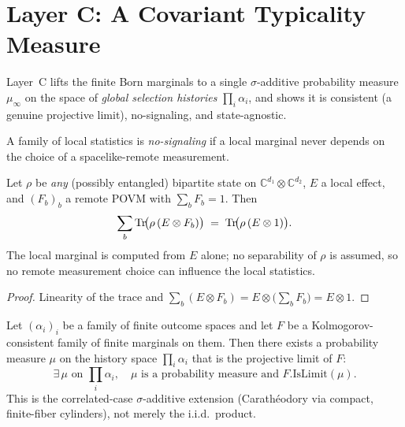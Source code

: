 \chapter{Layer C: A Covariant Typicality Measure}
\label{chap:layerC}

Layer~C lifts the finite Born marginals to a single $\sigma$-additive probability
measure $\mu_\infty$ on the space of \emph{global selection histories}
$\prod_i \alpha_i$, and shows it is consistent (a genuine projective limit),
no-signaling, and state-agnostic.

\begin{definition}
  \label{def:no-signaling}
  A family of local statistics is \emph{no-signaling} if a local marginal never
  depends on the choice of a spacelike-remote measurement.
\end{definition}

\begin{theorem}
  \label{thm:no-signaling}
  \leanok
  Let $\rho$ be \emph{any} (possibly entangled) bipartite state on
  $\mathbb{C}^{d_1}\otimes\mathbb{C}^{d_2}$, $E$ a local effect, and $(F_b)_b$ a
  remote POVM with $\sum_b F_b = 1$. Then
  \[
    \sum_b \operatorname{Tr}\!\bigl(\rho\,(E\otimes F_b)\bigr)
    \;=\; \operatorname{Tr}\!\bigl(\rho\,(E\otimes 1)\bigr) .
  \]
  The local marginal is computed from $E$ alone; no separability of $\rho$ is
  assumed, so no remote measurement choice can influence the local statistics.
\end{theorem}

\begin{proof}
  \leanok
  Linearity of the trace and $\sum_b (E\otimes F_b) = E\otimes\bigl(\sum_b F_b\bigr)
  = E\otimes 1$.
\end{proof}

\begin{theorem}
  \label{thm:exists-islimit}
  \leanok
  Let $(\alpha_i)_i$ be a family of finite outcome spaces and let $F$ be a
  Kolmogorov-consistent family of finite marginals on them. Then there exists a
  probability measure $\mu$ on the history space $\prod_i \alpha_i$ that is the
  projective limit of $F$:
  \[
    \exists\, \mu \text{ on } {\textstyle\prod_i}\alpha_i, \quad
    \mu \text{ is a probability measure and } F.\mathrm{IsLimit}(\mu).
  \]
  This is the correlated-case $\sigma$-additive extension (Carath\'eodory via
  compact, finite-fiber cylinders), not merely the i.i.d.\ product.
\end{theorem}

